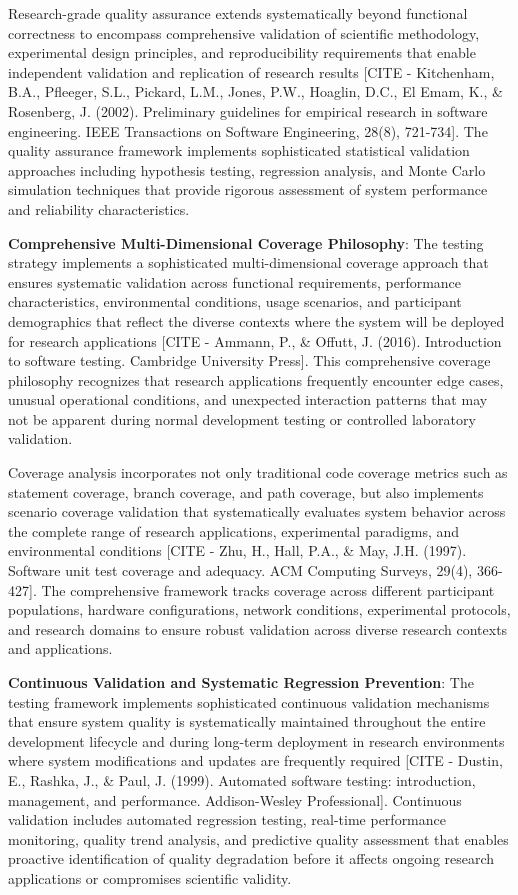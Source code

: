 \documentclass[12pt,a4paper]{article}
\begin{document}
Research-grade quality assurance extends systematically beyond functional correctness to encompass comprehensive
validation of scientific methodology, experimental design principles, and reproducibility requirements that enable
independent validation and replication of research
results [CITE - Kitchenham, B.A., Pfleeger, S.L., Pickard, L.M., Jones, P.W., Hoaglin, D.C., El Emam, K., \& Rosenberg, J. (2002). Preliminary guidelines for empirical research in software engineering. IEEE Transactions on Software Engineering, 28(8), 721-734].
The quality assurance framework implements sophisticated statistical validation approaches including hypothesis testing,
regression analysis, and Monte Carlo simulation techniques that provide rigorous assessment of system performance and
reliability characteristics.

\textbf{Comprehensive Multi-Dimensional Coverage Philosophy}: The testing strategy implements a sophisticated
multi-dimensional coverage approach that ensures systematic validation across functional requirements, performance
characteristics, environmental conditions, usage scenarios, and participant demographics that reflect the diverse
contexts where the system will be deployed for research
applications [CITE - Ammann, P., \& Offutt, J. (2016). Introduction to software testing. Cambridge University Press].
This comprehensive coverage philosophy recognizes that research applications frequently encounter edge cases, unusual
operational conditions, and unexpected interaction patterns that may not be apparent during normal development testing
or controlled laboratory validation.

Coverage analysis incorporates not only traditional code coverage metrics such as statement coverage, branch coverage,
and path coverage, but also implements scenario coverage validation that systematically evaluates system behavior across
the complete range of research applications, experimental paradigms, and environmental
conditions [CITE - Zhu, H., Hall, P.A., \& May, J.H. (1997). Software unit test coverage and adequacy. ACM Computing Surveys, 29(4), 366-427].
The comprehensive framework tracks coverage across different participant populations, hardware configurations, network
conditions, experimental protocols, and research domains to ensure robust validation across diverse research contexts
and applications.

\textbf{Continuous Validation and Systematic Regression Prevention}: The testing framework implements sophisticated
continuous validation mechanisms that ensure system quality is systematically maintained throughout the entire
development lifecycle and during long-term deployment in research environments where system modifications and updates
are frequently
required [CITE - Dustin, E., Rashka, J., \& Paul, J. (1999). Automated software testing: introduction, management, and performance. Addison-Wesley Professional].
Continuous validation includes automated regression testing, real-time performance monitoring, quality trend analysis,
and predictive quality assessment that enables proactive identification of quality degradation before it affects ongoing
research applications or compromises scientific validity.
\end{document}
